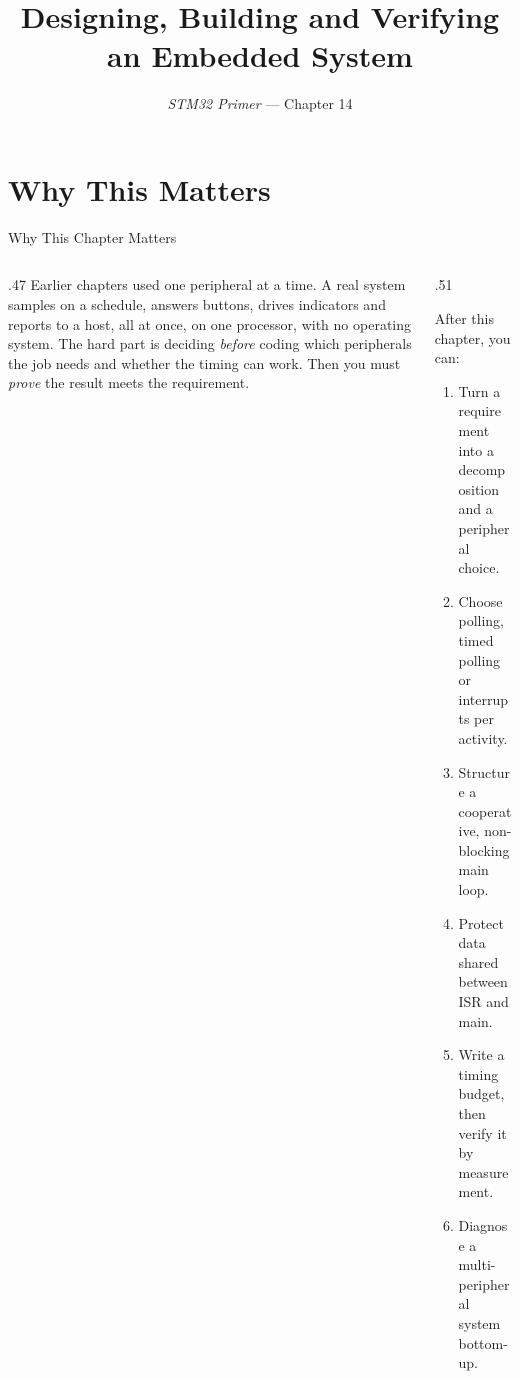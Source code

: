 \documentclass[9pt,aspectratio=169,xcolor=table]{beamer}
\title{Designing, Building and Verifying an Embedded System}
\subtitle{\emph{STM32 Primer} --- Chapter 14}
\begin{document}
\titlepage

\section{Why This Matters}

\begin{frame}{Why This Chapter Matters}
    \begin{columns}[T]
    \begin{column}{.47\textwidth}
        {\normalsize Earlier chapters used one peripheral at a time. A real system samples on a schedule, answers buttons, drives indicators and reports to a host, all at once, on one processor, with no operating system. The hard part is deciding \emph{before} coding which peripherals the job needs and whether the timing can work. Then you must \emph{prove} the result meets the requirement.}
    \end{column}
    \begin{column}{.51\textwidth}
        \begin{block}{After this chapter, you can:}
        {\small
        \begin{enumerate}\itemsep2pt
            \item Turn a requirement into a decomposition and a peripheral choice.
            \item Choose polling, timed polling or interrupts per activity.
            \item Structure a cooperative, non-blocking main loop.
            \item Protect data shared between ISR and main.
            \item Write a timing budget, then verify it by measurement.
            \item Diagnose a multi-peripheral system bottom-up.
        \end{enumerate}}
        \end{block}
    \end{column}
    \end{columns}
\end{frame}
\end{document}
